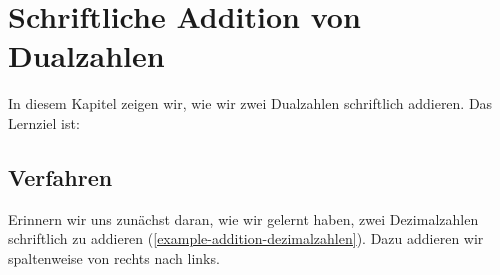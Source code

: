 
\toggletrue{image}
\toggletrue{imagehover}

\chapter[Schriftliche Addition]{Schriftliche Addition von Dualzahlen}
\label{ch:schriftliche-addition-dualzahlen}

In diesem Kapitel zeigen wir, wie wir zwei Dualzahlen schriftlich addieren. Das Lernziel ist:\\


\section{Verfahren}

Erinnern wir uns zunächst daran, wie wir gelernt haben, zwei Dezimalzahlen schriftlich zu addieren (\autoref{example-addition-dezimalzahlen}). Dazu addieren wir spaltenweise von rechts nach links.

